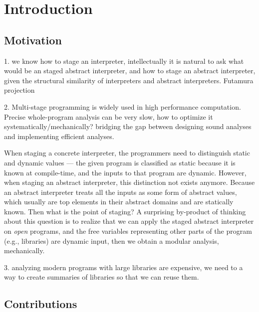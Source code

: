 \section{Introduction}

\subsection{Motivation}

1. we know how to stage an interpreter, intellectually it is natural to ask what would be an staged abstract interpreter,
and how to stage an abstract interpreter, given the structural similarity of interpreters and abstract interpreters. 
Futamura projection \cite{Futamura1999}

2. Multi-stage programming is widely used in high performance computation.
Precise whole-program analysis can be very slow, how to optimize it systematically/mechanically?
bridging the gap between designing sound analyses and implementing efficient analyses.

When staging a concrete interpreter, the programmers need to distinguish static and dynamic values
--- the given program is classified as static because it is known at compile-time, and the inputs to that program 
are dynamic. However, when staging an abstract interpreter, this distinction not exists anymore. 
Because an abstract interpreter treats all the inputs as some form of abstract values, which usually are 
top elements in their abstract domains and are statically known. Then what is the point of staging?
A surprising by-product of thinking about this question is to realize that we can apply the staged
abstract interpreter on \textit{open} programs, and the free variables representing other parts of 
the program (e.g., libraries) are dynamic input, then we obtain a modular analysis, mechanically.

3. analyzing modern programs with large libraries are expensive, we need to a way to create
summaries of libraries so that we can reuse them.

\subsection{Contributions}

